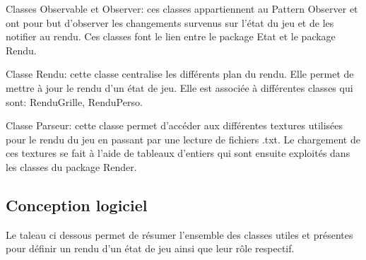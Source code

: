 \documentclass[11pt, a4paper]{article}
\begin{document}
Classes Observable et Observer:  ces classes appartiennent au Pattern Observer et ont pour but d'observer les changements survenus sur l'état du jeu et de les notifier au rendu. Ces classes font le lien entre le package Etat et le package Rendu.

Classe Rendu: cette classe centralise les différents plan du rendu. Elle permet de mettre à jour le rendu d'un état de jeu. Elle est associée à différentes classes qui sont: RenduGrille, RenduPerso.

Classe Parseur: cette classe permet d’accéder aux différentes textures utilisées pour le rendu du jeu en passant par une lecture de fichiers .txt. Le chargement de ces textures se fait à l’aide de tableaux d’entiers qui sont ensuite exploités dans les classes du package Render.

\subsection{Conception logiciel}

Le taleau ci dessous permet de résumer l’ensemble des classes utiles et présentes pour définir un rendu d'un état de jeu ainsi que leur rôle respectif.
\end{document}
